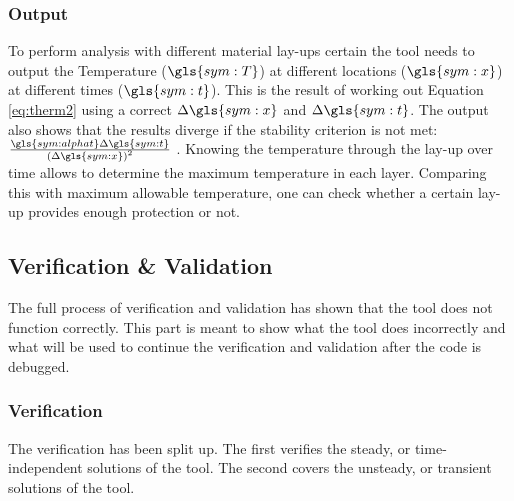 \subsubsection{Output}
\label{subsec:thermoutput}
To perform analysis with different material lay-ups certain the tool needs to output the Temperature ($\gls{sym:T}$) at different locations ($\gls{sym:x}$) at different times ($\gls{sym:t}$). This is the result of working out Equation \eqref{eq:therm2} using a correct $\Delta \gls{sym:x}$ and $\Delta \gls{sym:t}$. The output also shows that the results diverge if the stability criterion is not met: $\frac{\gls{sym:alphat}\Delta\gls{sym:t}}{\left(\Delta \gls{sym:x}\right)^2}$ \cite{Holman2002}. Knowing the temperature through the lay-up over time allows to determine the maximum temperature in each layer. Comparing this with maximum allowable temperature, one can check whether a certain lay-up provides enough protection or not.

\subsection{Verification \& Validation}
The full process of verification and validation has shown that the tool does not function correctly. This part is meant to show what the tool does incorrectly and what will be used to continue the verification and validation after the code is debugged.

\subsubsection{Verification}
The verification has been split up. The first verifies the steady, or time-independent solutions of the tool. The second covers the unsteady, or transient solutions of the tool.

